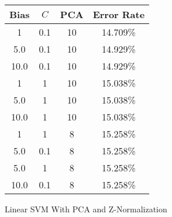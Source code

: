 \begin{center}
\begin{tabular}{|c|c|c|c|}
\hline
Bias & $C$ & PCA & Error Rate \\
\hline
1 & 0.1 & 10 & 14.709\% \\
\hline
5.0 & 0.1 & 10 & 14.929\% \\
\hline
10.0 & 0.1 & 10 & 14.929\% \\
\hline
1 & 1 & 10 & 15.038\% \\
\hline
5.0 & 1 & 10 & 15.038\% \\
\hline
10.0 & 1 & 10 & 15.038\% \\
\hline
1 & 1 & 8 & 15.258\% \\
\hline
5.0 & 0.1 & 8 & 15.258\% \\
\hline
5.0 & 1 & 8 & 15.258\% \\
\hline
10.0 & 0.1 & 8 & 15.258\% \\
\hline
\end{tabular}
\end{center}
\caption{Linear SVM With PCA and Z-Normalization}\label{tab:svm_linpcan_acctable}
